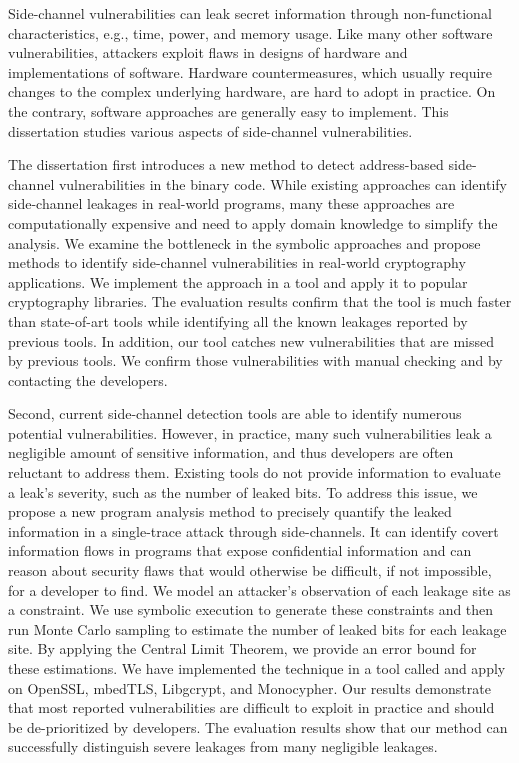 
Side-channel vulnerabilities can leak secret information through non-functional characteristics, e.g., time, power, and memory usage. Like many other software vulnerabilities, attackers exploit flaws in designs of hardware and implementations of software. Hardware countermeasures, which usually require changes to the complex underlying hardware, are hard to adopt in practice. On the contrary, software approaches are generally easy to implement. This dissertation studies various aspects of side-channel vulnerabilities.

The dissertation first introduces a new method to detect address-based side-channel vulnerabilities in the binary code. While existing approaches can identify side-channel leakages in real-world programs, many these approaches are computationally expensive and need to apply domain knowledge to simplify the analysis.  We examine the bottleneck in the symbolic approaches and propose methods to identify side-channel vulnerabilities in real-world cryptography applications. We implement the approach in a tool and apply it to popular cryptography libraries. The evaluation results confirm that the tool is much faster than state-of-art tools while identifying all the known leakages reported by previous tools. In addition, our tool catches new vulnerabilities that are missed by previous tools. We confirm those vulnerabilities with manual checking and by contacting the developers.

Second, current side-channel detection tools are able to identify numerous potential vulnerabilities. However, in practice, many such vulnerabilities leak a negligible amount of sensitive information, and thus developers are often reluctant to address them. Existing tools do not provide information to evaluate a leak’s severity, such as the number of leaked bits. To address this issue, we propose a new program analysis method to precisely quantify the leaked information in a single-trace attack through side-channels. It can identify covert information flows in programs that expose confidential information and can reason about security flaws that would otherwise be difficult, if not impossible, for a developer to find. We model an attacker’s observation of each leakage site as a constraint. We use symbolic execution to generate these constraints and then run Monte Carlo sampling to estimate the number of leaked bits for each leakage site. By applying the Central Limit Theorem, we provide an error bound for these estimations. We have implemented the technique in a tool called \tool{} and apply \tool{} on OpenSSL, mbedTLS, Libgcrypt, and Monocypher. Our results demonstrate that most reported vulnerabilities are difficult to exploit in practice and should be de-prioritized by developers. The evaluation results show that our method can successfully distinguish severe leakages from many negligible leakages. 


